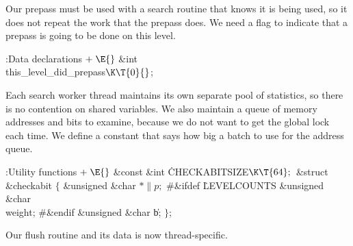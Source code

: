 Our prepass must be used with a search routine that knows it
is being used, so it does not repeat the work that the prepass does.
We need a flag to indicate that a prepass is going to be done on
this level.

\Y\B\4:Data declarations\X${}\mathrel+\E{}$\6
\&{int} \\{this\_level\_did\_prepass}${}\K\T{0}{}$;\par
\fi

Each search worker thread maintains its own separate pool
of statistics, so there is no contention on shared variables.
We also maintain a queue of memory addresses and bits to
examine, because we do not want to get the global lock each
time.  We define a constant that says how big a batch to
use for the address queue.

\Y\B\4:Utility functions\X${}\mathrel+\E{}$\6
\&{const} \&{int} \.{CHECKABITSIZE}${}\K\T{64};{}$\6
\&{struct} \&{checkabit} ${}\{{}$\1\6
\&{unsigned} \&{char} ${}{*}\|p;{}$\6
\8\#\&{ifdef} \.{LEVELCOUNTS}\6
\&{unsigned} \&{char} \\{weight};\6
\8\#\&{endif}\6
\&{unsigned} \&{char} \|b;\2\6
${}\}{}$;\par
\fi

Our flush routine and its data is now thread-specific.

